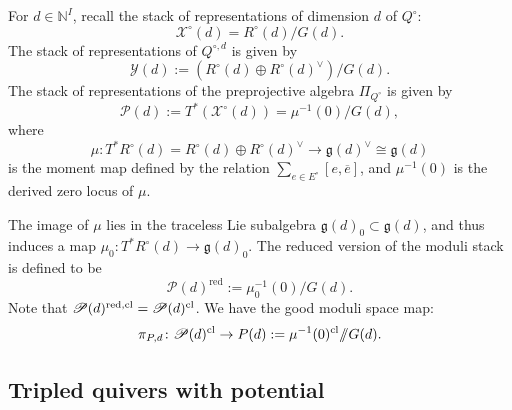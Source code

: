 \documentclass [11pt,oneside,a4paper,mathscr]{amsart}
\theoremstyle{definition}
\newcommand{\X}{\mathscr{X}}
\newcommand{\ssslash}{/\!\!/}
\begin{document}
For $d\in \mathbb{N}^I$, recall the stack of representations of dimension $d$ of $Q^{\circ}$:
\[\X^\circ(d)=R^\circ(d)/G(d).\]
The stack of representations of $Q^{\circ, d}$ is
given by 
\[\mathscr{Y}(d):=(R^\circ(d)\oplus R^\circ(d)^\vee)/G(d).\]
The stack of representations of the preprojective algebra $\Pi_{Q^{\circ}}$ is given by 
\[\mathscr{P}(d):=T^*\left(\X^\circ(d)\right)=\mu^{-1}(0)/G(d),\]
where \[\mu\colon T^*R^\circ(d)=R^\circ(d)\oplus R^\circ(d)^\vee\to \mathfrak{g}(d)^\vee\cong \mathfrak{g}(d)\] is the moment map 
defined by the relation 
$\sum_{e \in E^{\circ}}[e, \overline{e}]$,
and $\mu^{-1}(0)$ is the derived zero locus of $\mu$. 

The image of $\mu$ lies in the traceless Lie subalgebra $\mathfrak{g}(d)_0\subset \mathfrak{g}(d)$, and thus induces a map $\mu_0\colon T^*R^\circ(d)\to \mathfrak{g}(d)_0$.  
The reduced version of the moduli stack 
is defined to be  
\[\mathscr{P}(d)^{\mathrm{red}}:=\mu_0^{-1}(0)/G(d).\]
Note that $\mathscr{P}(d)^{\mathrm{red, cl}}=\mathscr{P}(d)^{\rm{cl}}$. 
We have the good moduli space map:
\[\pi_{P,d}\colon \mathscr{P}(d)^{\mathrm{cl}}\to P(d):=\mu^{-1}(0)^{\rm{cl}}\ssslash G(d).\] 

\subsection{Tripled quivers with potential}\label{subsec29}
\end{document}
